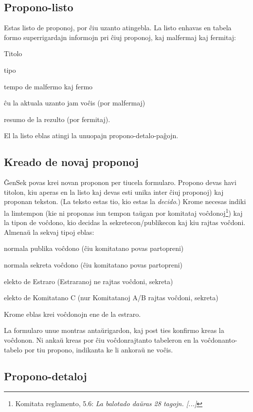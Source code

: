 \documentclass[draft]{scrartcl}
\newenvironment{itemize*}{%
  \begin{itemize}%
  \setlength{\itemsep}{0pt}%
  \setlength{\parsep}{0pt}%
  \setlength{\parskip}{2pt plus 1pt}
  \setlength{\topsep}{1pt}%
}{%
    \end{itemize}%
}
\begin{document}
\subsection{Propono-listo}

Estas listo de proponoj, por ĉiu uzanto atingebla. La listo
enhavas en tabela formo superrigardajn informojn pri ĉiuj proponoj,
kaj malfermaj kaj fermitaj:
\begin{itemize*}
\item Titolo
\item tipo
\item tempo de malfermo kaj fermo
\item ĉu la aktuala uzanto jam voĉis (por malfermaj)
\item resumo de la rezulto (por fermitaj).
\end{itemize*}
El la listo eblas atingi la unuopajn propono-detalo-paĝojn.

\subsection{Kreado de novaj proponoj}

ĜenSek povas krei novan proponon per tiucela formularo.
Propono devas havi titolon, kiu aperas en la listo kaj devas esti unika
inter ĉiuj proponoj) kaj proponan tekston. (La teksto estas tio, kio
estas la \emph{decido}.)
Krome necesas indiki la limtempon (kie ni proponas iun tempon taŭgan
por komitataj voĉdonoj\footnote{Komitata reglamento, 5.6:
  \emph{La balotado daŭras 28 tagojn. [...]}}) kaj la tipon de voĉdono,
  kio decidas la sekretecon/publikecon kaj kiu rajtas voĉdoni. Almenaŭ la
  sekvaj tipoj eblas:
\begin{itemize*}
\item normala publika voĉdono (ĉiu komitatano povas partopreni)
\item normala sekreta voĉdono (ĉiu komitatano povas partopreni)
\item elekto de Estraro (Estraranoj ne rajtas voĉdoni, sekreta)
\item elekto de Komitatano C (nur Komitatanoj A/B rajtas voĉdoni, sekreta)
\end{itemize*}
Krome eblas krei voĉdonojn ene de la estraro.

La formularo unue montras antaŭrigardon, kaj post ties konfirmo kreas
la voĉdonon. Ni ankaŭ kreas por ĉiu voĉdonrajtanto tabeleron en la
voĉdonanto-tabelo por tiu propono, indikanta ke li ankoraŭ ne voĉis.

\subsection{Propono-detaloj} \label{propono-detaloj}
\end{document}
